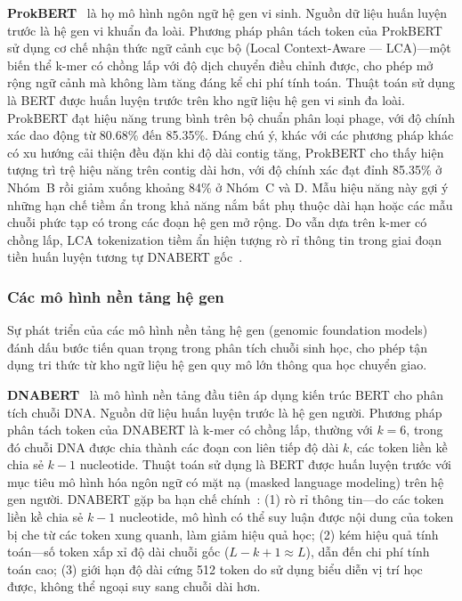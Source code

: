 \textbf{ProkBERT}~\cite{ligeti2024prokbert} là họ mô hình ngôn ngữ hệ gen vi sinh. Nguồn dữ liệu huấn luyện trước là hệ gen vi khuẩn đa loài. Phương pháp phân tách token của ProkBERT sử dụng cơ chế nhận thức ngữ cảnh cục bộ (Local Context-Aware --- LCA)---một biến thể k-mer có chồng lấp với độ dịch chuyển điều chỉnh được, cho phép mở rộng ngữ cảnh mà không làm tăng đáng kể chi phí tính toán. Thuật toán sử dụng là BERT được huấn luyện trước trên kho ngữ liệu hệ gen vi sinh đa loài. ProkBERT đạt hiệu năng trung bình trên bộ chuẩn phân loại phage, với độ chính xác dao động từ 80.68\% đến 85.35\%. Đáng chú ý, khác với các phương pháp khác có xu hướng cải thiện đều đặn khi độ dài contig tăng, ProkBERT cho thấy hiện tượng trì trệ hiệu năng trên contig dài hơn, với độ chính xác đạt đỉnh 85.35\% ở Nhóm~B rồi giảm xuống khoảng 84\% ở Nhóm~C và D. Mẫu hiệu năng này gợi ý những hạn chế tiềm ẩn trong khả năng nắm bắt phụ thuộc dài hạn hoặc các mẫu chuỗi phức tạp có trong các đoạn hệ gen mở rộng. Do vẫn dựa trên k-mer có chồng lấp, LCA tokenization tiềm ẩn hiện tượng rò rỉ thông tin trong giai đoạn tiền huấn luyện tương tự DNABERT gốc~\cite{ji2021dnabert,ligeti2024prokbert}.

\subsubsection{Các mô hình nền tảng hệ gen}

Sự phát triển của các mô hình nền tảng hệ gen (genomic foundation models) đánh dấu bước tiến quan trọng trong phân tích chuỗi sinh học, cho phép tận dụng tri thức từ kho ngữ liệu hệ gen quy mô lớn thông qua học chuyển giao.

\textbf{DNABERT}~\cite{ji2021dnabert} là mô hình nền tảng đầu tiên áp dụng kiến trúc BERT cho phân tích chuỗi DNA. Nguồn dữ liệu huấn luyện trước là hệ gen người. Phương pháp phân tách token của DNABERT là k-mer có chồng lấp, thường với $k=6$, trong đó chuỗi DNA được chia thành các đoạn con liên tiếp độ dài $k$, các token liền kề chia sẻ $k-1$ nucleotide. Thuật toán sử dụng là BERT được huấn luyện trước với mục tiêu mô hình hóa ngôn ngữ có mặt nạ (masked language modeling) trên hệ gen người. DNABERT gặp ba hạn chế chính~\cite{zhou2023dnabert}: (1) rò rỉ thông tin---do các token liền kề chia sẻ $k-1$ nucleotide, mô hình có thể suy luận được nội dung của token bị che từ các token xung quanh, làm giảm hiệu quả học; (2) kém hiệu quả tính toán---số token xấp xỉ độ dài chuỗi gốc ($L - k + 1 \approx L$), dẫn đến chi phí tính toán cao; (3) giới hạn độ dài cứng 512 token do sử dụng biểu diễn vị trí học được, không thể ngoại suy sang chuỗi dài hơn.

